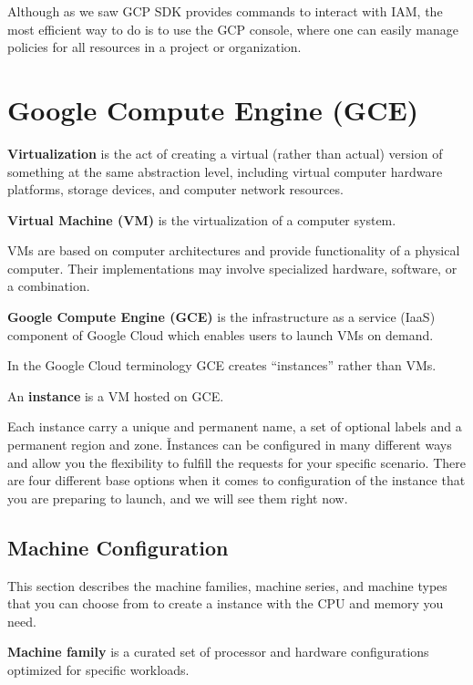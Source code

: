 Although as we saw GCP SDK provides commands to interact with IAM, the most efficient way to do is to use the GCP
console, where one can easily manage policies for all resources in a project or organization.

\section{Google Compute Engine (GCE)}

\bd[Virtualization]
\textbf{Virtualization} is the act of creating a virtual (rather than actual) version of something at the same
abstraction level, including virtual computer hardware platforms, storage devices, and computer network resources.
\ed

\textbf{Virtual Machine (VM)} is the virtualization of a computer system.
\ed

VMs are based on computer architectures and provide functionality of a physical computer. Their implementations may
involve specialized hardware, software, or a combination.

\textbf{Google Compute Engine (GCE)} is the infrastructure as a service (IaaS) component of Google Cloud which enables
users to launch VMs on demand.
\ed

In the Google Cloud terminology GCE creates ``instances'' rather than VMs.

\bd[Instance]
An \textbf{instance} is a VM hosted on GCE\@.
\ed

Each instance carry a unique and permanent name, a set of optional labels and a permanent region and zone. \v

Instances can be configured in many different ways and allow you the flexibility to fulfill the requests for your
specific scenario. There are four different base options when it comes to configuration of the instance that you are
preparing to launch, and we will see them right now.

\subsection{Machine Configuration}

This section describes the machine families, machine series, and machine types that you can choose from to create a
instance with the CPU and memory you need.

\textbf{Machine family} is a curated set of processor and hardware configurations optimized for specific workloads.
\ed

